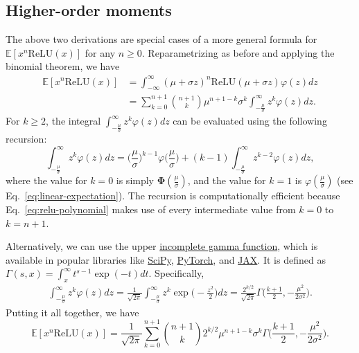 \documentclass{article}
\theoremstyle{plain}
\theoremstyle{definition}
\theoremstyle{remark}
\newcommand{\Pphi}{\boldsymbol{\Phi}}
\newcommand{\E}{\mathbb{E}}
\begin{document}
\subsection{Higher-order moments}

The above two derivations are special cases of a more general formula for $\E[ x^n \mathrm{ReLU}(x) ]$ for any $n \geq 0$. Reparametrizing as before and applying the binomial theorem, we have
\begin{align}
    \E[ x^n \mathrm{ReLU}(x) ] &= \int_{-\infty}^{\infty} (\mu + \sigma z)^n \mathrm{ReLU}(\mu + \sigma z) \varphi(z) dz \\
    &= \sum_{k = 0}^{n + 1} \binom{n + 1}{k} \mu^{n + 1 - k} \sigma^k \int_{-\frac{\mu}{\sigma}}^\infty z^k \varphi(z) dz. \label{eq:relu-polynomial}
\end{align}
For $k \geq 2$, the integral $\int_{-\frac{\mu}{\sigma}}^\infty z^k \varphi(z) dz$ can be evaluated using the following recursion:
\begin{equation}
    \int_{-\frac{\mu}{\sigma}}^\infty z^k \varphi(z) dz = \Big ( \frac{\mu}{\sigma} \Big )^{k - 1} \varphi \Big ( \frac{\mu}{\sigma} \Big ) + (k - 1) \int_{-\frac{\mu}{\sigma}}^\infty z^{k - 2} \varphi(z) dz,
\end{equation}
where the value for $k = 0$ is simply $\Pphi(\frac{\mu}{\sigma})$, and the value for $k = 1$ is  $\varphi(\frac{\mu}{\sigma})$ (see Eq.~\ref{eq:linear-expectation}). The recursion is computationally efficient because Eq.~\ref{eq:relu-polynomial} makes use of every intermediate value from $k = 0$ to $k = n + 1$.

Alternatively, we can use the upper \href{https://en.wikipedia.org/wiki/Incomplete_gamma_function}{incomplete gamma function}, which is available in popular libraries like \href{https://docs.scipy.org/doc/scipy/reference/generated/scipy.special.gammainc.html}{SciPy}, \href{https://pytorch.org/docs/stable/special.html#torch.special.gammaincc}{PyTorch}, and \href{https://jax.readthedocs.io/en/latest/_autosummary/jax.scipy.special.gammainc.html}{JAX}. It is defined as $\Gamma(s, x) = \int_x^{\infty} t^{s - 1} \exp(-t) dt$. Specifically,
\begin{align}
    \int_{-\frac{\mu}{\sigma}}^\infty z^k \varphi(z) dz = \frac{1}{\sqrt{2 \pi}} \int_{-\frac{\mu}{\sigma}}^\infty z^k \exp \Big ( -\frac{z^2}{2} \Big ) dz = \frac{2^{k/2}}{\sqrt{2 \pi}} \Gamma \Big ( \frac{k + 1}{2}, -\frac{\mu^2}{2 \sigma^2} \Big ).
\end{align}
Putting it all together, we have
\begin{equation}
    \E[ x^n \mathrm{ReLU}(x) ] = \frac{1}{\sqrt{2 \pi}} \sum_{k = 0}^{n + 1} \binom{n + 1}{k} 2^{k/2} \mu^{n + 1 - k} \sigma^k \Gamma \Big ( \frac{k + 1}{2}, -\frac{\mu^2}{2 \sigma^2} \Big ).
\end{equation}
\end{document}
